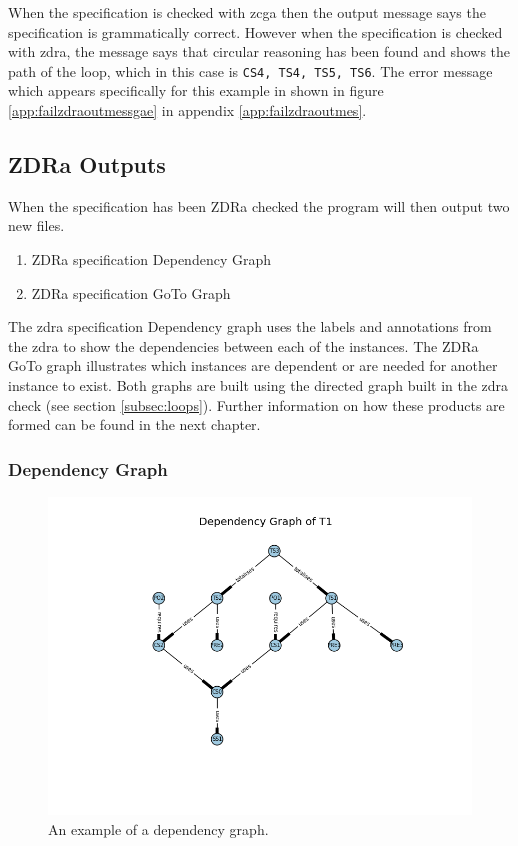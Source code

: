 When the specification is checked with \gls{zcga} then the output message says
the specification is grammatically correct. However when the specification is
checked with \gls{zdra}, the message says that circular reasoning has been found
and shows the path of the loop, which in this case is \verb|CS4, TS4, TS5, TS6|.
The error message which appears specifically for this example in shown in figure
\ref{app:failzdraoutmessgae} in appendix \ref{app:failzdraoutmes}.

\subsection{ZDRa Outputs}
\label{subsec:zdra_prodcuts}

When the specification has been ZDRa checked the program will then output two
new files. 

\begin{enumerate}

\item ZDRa specification Dependency Graph

\item ZDRa specification GoTo Graph
\end{enumerate}

The \gls{zdra} specification Dependency graph uses the labels and annotations
from the \gls{zdra} to show the dependencies between each of the instances. The
ZDRa GoTo graph illustrates which instances are dependent or are needed for
another instance to exist. Both graphs are built using the directed graph built
in the \gls{zdra} check (see section \ref{subsec:loops}). Further information on
how these products are formed can be found in the next chapter.

\subsubsection{Dependency Graph}

\begin{figure}[H]
\centering
\includegraphics[scale=0.6]{Figures/zdra/depgraph.png}
\caption{An example of a dependency graph. \label{fig:depgraph}}
\end{figure}

